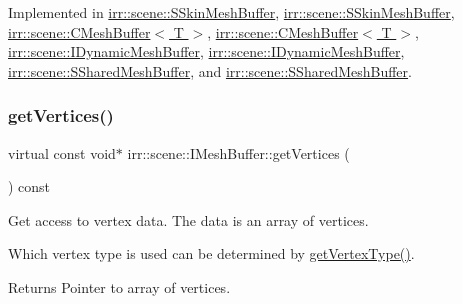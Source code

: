 Implemented in \hyperlink{structirr_1_1scene_1_1SSkinMeshBuffer_a8a249cbb52eba63a694bff2e4a81667b}{irr\+::scene\+::\+S\+Skin\+Mesh\+Buffer}, \hyperlink{structirr_1_1scene_1_1SSkinMeshBuffer_a8a249cbb52eba63a694bff2e4a81667b}{irr\+::scene\+::\+S\+Skin\+Mesh\+Buffer}, \hyperlink{classirr_1_1scene_1_1CMeshBuffer_a341db661218a49d8d8fd12550700cb67}{irr\+::scene\+::\+C\+Mesh\+Buffer$<$ T $>$}, \hyperlink{classirr_1_1scene_1_1CMeshBuffer_a341db661218a49d8d8fd12550700cb67}{irr\+::scene\+::\+C\+Mesh\+Buffer$<$ T $>$}, \hyperlink{classirr_1_1scene_1_1IDynamicMeshBuffer_a3e7523774efaf9a177de6396dfdc14e2}{irr\+::scene\+::\+I\+Dynamic\+Mesh\+Buffer}, \hyperlink{classirr_1_1scene_1_1IDynamicMeshBuffer_a3e7523774efaf9a177de6396dfdc14e2}{irr\+::scene\+::\+I\+Dynamic\+Mesh\+Buffer}, \hyperlink{structirr_1_1scene_1_1SSharedMeshBuffer_af6e2e8a103a2c0713d5a090d92a4edb6}{irr\+::scene\+::\+S\+Shared\+Mesh\+Buffer}, and \hyperlink{structirr_1_1scene_1_1SSharedMeshBuffer_af6e2e8a103a2c0713d5a090d92a4edb6}{irr\+::scene\+::\+S\+Shared\+Mesh\+Buffer}.

\mbox{\label{classirr_1_1scene_1_1IMeshBuffer_a99891e516246b2cff13b362a435c8028}} 
\subsubsection{\texorpdfstring{get\+Vertices()}{getVertices()}\hspace{0.1cm}{\footnotesize\ttfamily [1/4]}}
{\footnotesize\ttfamily virtual const void$\ast$ irr\+::scene\+::\+I\+Mesh\+Buffer\+::get\+Vertices (\begin{DoxyParamCaption}{ }\end{DoxyParamCaption}) const\hspace{0.3cm}{\ttfamily [pure virtual]}}



Get access to vertex data. The data is an array of vertices. 

Which vertex type is used can be determined by \hyperlink{classirr_1_1scene_1_1IMeshBuffer_a4d7a84ae4416487736f0ed0f519bb4f0}{get\+Vertex\+Type()}. \begin{DoxyReturn}{Returns}
Pointer to array of vertices. 
\end{DoxyReturn}


